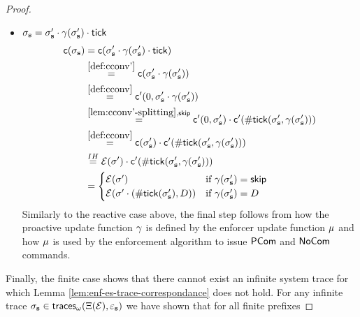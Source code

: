 \begin{proof}
\begin{itemize}
\begin{itemize}
            \item $\sigma_{\mathbf{s}} = \sigma_{\mathbf{s}}' \cdot \gamma(\sigma_{\mathbf{s}}') \cdot \mathsf{tick}$
            \begin{align*}
                \mathsf{c}(\sigma_{\mathbf{s}})
                &= \mathsf{c}(\sigma_{\mathbf{s}}' \cdot \gamma(\sigma_{\mathbf{s}}') \cdot \mathsf{tick}) \\
                &\stackrel{\ref{def:cconv'}}{=}
                    \mathsf{c}(\sigma_{\mathbf{s}}' \cdot \gamma(\sigma_{\mathbf{s}}')) \\
                &\stackrel{\ref{def:cconv}}{=}
                    \mathsf{c}'(0, \sigma_{\mathbf{s}}' \cdot \gamma(\sigma_{\mathbf{s}}')) \\
                &\stackrel{\ref{lem:cconv'-splitting}, \mathsf{skip}}{=}
                    \mathsf{c}'(0, \sigma_{\mathbf{s}}') \cdot
                    \mathsf{c}'(\mathsf{\#tick}(\sigma_{\mathbf{s}}',
                    \gamma(\sigma_{\mathbf{s}}'))) \\
                &\stackrel{\ref{def:cconv}}{=}
                    \mathsf{c}(\sigma_{\mathbf{s}}') \cdot
                    \mathsf{c}'(\mathsf{\#tick}(\sigma_{\mathbf{s}}',
                    \gamma(\sigma_{\mathbf{s}}'))) \\
                &\stackrel{IH}{=}
                    \mathcal{E}(\sigma') \cdot
                    \mathsf{c}'(\mathsf{\#tick}(\sigma_{\mathbf{s}}',
                    \gamma(\sigma_{\mathbf{s}}'))) \\
                &= \begin{cases}
                    \mathcal{E}(\sigma')
                        &\text{if } \gamma(\sigma_{\mathbf{s}}')  = \mathsf{skip} \\
                    \mathcal{E}(\sigma' \cdot (\mathsf{\#tick}(\sigma_{\mathbf{s}}'), D))
                        &\text{if } \gamma(\sigma_{\mathbf{s}}') = D
                \end{cases}
            \end{align*}
            Similarly to the reactive case above, the final step follows
            from how the proactive update function $\gamma$ is defined
            by the enforcer update function $\mu$ and
            how $\mu$ is used by the enforcement algorithm to
            issue $\mathsf{PCom}$ and $\mathsf{NoCom}$ commands.
        \end{itemize}
    \end{itemize}
    Finally, the finite case shows that there
    cannot exist an infinite system trace for which Lemma
    \ref{lem:enf-es-trace-correspondance}
    does not hold.
    For any infinite trace
    $\sigma_{\mathbf{s}} \in \mathsf{traces}_\omega(\Xi(\mathcal{E}), \varepsilon_{\mathbf{s}})$
    we have shown that for all finite prefixes

\end{proof}
